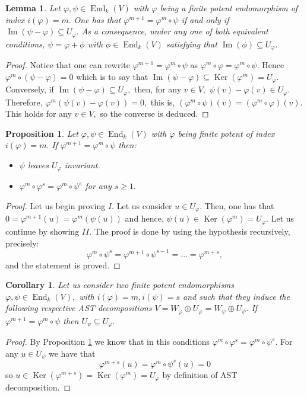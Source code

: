 \documentclass[10pt,a4paper]{amsart}
\newtheorem{cor}[defn]{Corollary}
\newtheorem{lem}[defn]{Lemma}
\newtheorem{prop}[defn]{Proposition}
\theoremstyle{plain}
\theoremstyle{remark}
\numberwithin{equation}{section} \numberwithin{defn}{section}
\newcommand\ed{\operatorname{End}}
\newcommand{\Img}{\operatorname{Im}}
\newcommand\Ker{\operatorname{Ker}}
\newcommand{\f}{\varphi}
\newcommand{\g}{\psi}
\begin{document}
\begin{lem}\label{L: Resta en Uf}
Let $\f , \g \in \ed_k(V)$ with $\f$ being a finite potent endomorphism of index $i(\f)=m.$ One has that $\f^{m+1}=\f^m \circ \g $ if and only if $\Img(\g - \f)\subseteq U_{\f}.$ 
As a consequence, under any one of both equivalent conditions, $\g = \f + \phi$ with $\phi \in \ed_k(V)$ satisfying that $\Img(\phi)\subseteq U_{\f}.$
\end{lem}
\begin{proof}
Notice that one can rewrite $\f^{m+1}=\f^m\circ \g$ as $\f^m\circ \f=\f^m\circ \g .$ Hence $\f^m \circ (\g-\f)=0$ which is to say that $\Img(\g-\f)\subseteq \Ker(\f^m)=U_{\f}.$ Conversely, if $\Img(\g - \f)\subseteq U_{\f},$ then, for any $v\in V ,$ $\g(v)-\f(v)\in U_{\f}.$ Therefore, $\f^m (\g(v)-\f(v))=0,$ this is, $(\f^m \circ \g)(v)=(\f^m\circ \f)(v).$ This holds for any $v\in V,$ so the converse is deduced.
\end{proof}


\begin{prop}\label{P: Inv y Potencias}
Let $\f, \g \in \ed_k(V)$ with $\f$ being finite potent of index $i(\f)=m.$ If $\f^{m+1}=\f^m \circ \g $ then: \begin{itemize}
\item[I.)] $\g$ leaves $U_{\f}$ invariant.
\item[II.)] $\f^m\circ \f^s=\f^m\circ \g^s$ for any $s\geq 1 .$
\end{itemize}
\end{prop}
\begin{proof}
Let us begin proving $I.$ Let us consider $u\in U_{\f}.$ Then, one has that $0=\f^{m+1}(u)=\f^m(\g(u)) $ and hence, $\g(u)\in \Ker(\f^m)=U_{\f}.$ Let us continue by showing $II.$ The proof is done by using the hypothesis recursively, precisely: $$\f^m\circ \g^s=\f^{m+1}\circ \g^{s-1}=\dots =\f^{m+s}, $$ and the statement is proved.
\end{proof}

\begin{cor}\label{C: Ug en Uf}
Let us consider two finite potent endomorphisms $\f, \g \in \ed_k(V),$ with $i(\f)=m, i(\g)=s$ and such that they induce the following respective AST decompositions $V=W_{\f}\oplus U_{\f}=W_{\g}\oplus U_{\g}.$  If $\f^{m+1}=\f^m \circ \g $ then $U_{\g}\subseteq U_{\f}.$
\end{cor}
\begin{proof}
By Proposition \ref{P: Inv y Potencias} we know that in this conditions $\f^m\circ \f^s=\f^m\circ \g^s.$ For any $u\in U_{\g}$ we have that $$\f^{m+s}(u)=\f^m\circ \g^s(u)=0 $$ so $u\in \Ker(\f^{m+s})=\Ker(\f^m)=U_{\f}$ by definition of AST decomposition.
\end{proof}
\end{document}

